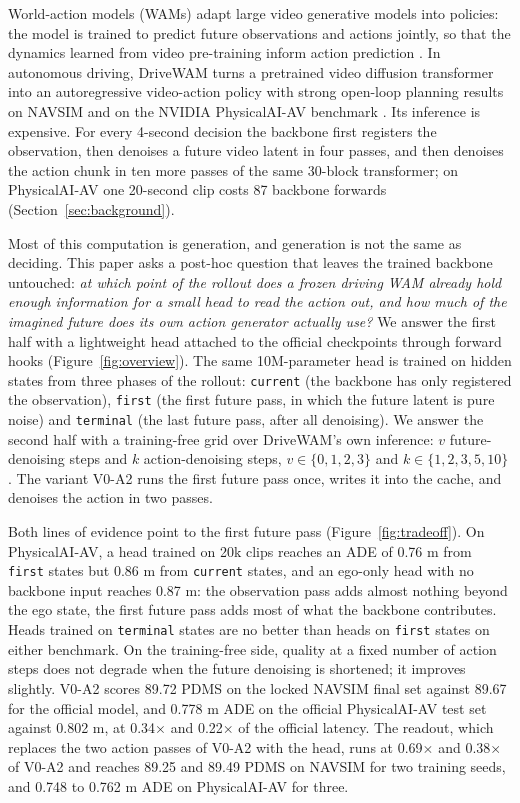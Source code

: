 \documentclass[10pt]{article}
\newcommand{\first}{\texttt{first}}
\newcommand{\current}{\texttt{current}}
\newcommand{\terminal}{\texttt{terminal}}
\newcommand{\VA}[2]{V#1-A#2}
\begin{document}
World-action models (WAMs) adapt large video generative models into policies: the model is trained to predict future observations and actions jointly, so that the dynamics learned from video pre-training inform action prediction \citep{shi2026drivewam,li2026lightwam,ma2026fasterwam}. In autonomous driving, DriveWAM \citep{shi2026drivewam} turns a pretrained video diffusion transformer \citep{wan2025wan} into an autoregressive video-action policy with strong open-loop planning results on NAVSIM \citep{dauner2024navsim} and on the NVIDIA PhysicalAI-AV benchmark \citep{nvidia2025physicalai}. Its inference is expensive. For every 4-second decision the backbone first registers the observation, then denoises a future video latent in four passes, and then denoises the action chunk in ten more passes of the same 30-block transformer; on PhysicalAI-AV one 20-second clip costs 87 backbone forwards (Section~\ref{sec:background}).

Most of this computation is generation, and generation is not the same as deciding. This paper asks a post-hoc question that leaves the trained backbone untouched: \emph{at which point of the rollout does a frozen driving WAM already hold enough information for a small head to read the action out, and how much of the imagined future does its own action generator actually use?} We answer the first half with a lightweight head attached to the official checkpoints through forward hooks (Figure~\ref{fig:overview}). The same 10M-parameter head is trained on hidden states from three phases of the rollout: \current{} (the backbone has only registered the observation), \first{} (the first future pass, in which the future latent is pure noise) and \terminal{} (the last future pass, after all denoising). We answer the second half with a training-free grid over DriveWAM's own inference: $v$ future-denoising steps and $k$ action-denoising steps, $v \in \{0,1,2,3\}$ and $k \in \{1,2,3,5,10\}$. The variant \VA{0}{2} runs the first future pass once, writes it into the cache, and denoises the action in two passes.

Both lines of evidence point to the first future pass (Figure~\ref{fig:tradeoff}). On PhysicalAI-AV, a head trained on 20k clips reaches an ADE of 0.76 m from \first{} states but 0.86 m from \current{} states, and an ego-only head with no backbone input reaches 0.87 m: the observation pass adds almost nothing beyond the ego state, the first future pass adds most of what the backbone contributes. Heads trained on \terminal{} states are no better than heads on \first{} states on either benchmark. On the training-free side, quality at a fixed number of action steps does not degrade when the future denoising is shortened; it improves slightly. \VA{0}{2} scores 89.72 PDMS on the locked NAVSIM final set against 89.67 for the official model, and 0.778 m ADE on the official PhysicalAI-AV test set against 0.802 m, at 0.34$\times$ and 0.22$\times$ of the official latency. The readout, which replaces the two action passes of \VA{0}{2} with the head, runs at 0.69$\times$ and 0.38$\times$ of \VA{0}{2} and reaches 89.25 and 89.49 PDMS on NAVSIM for two training seeds, and 0.748 to 0.762 m ADE on PhysicalAI-AV for three.
\end{document}
